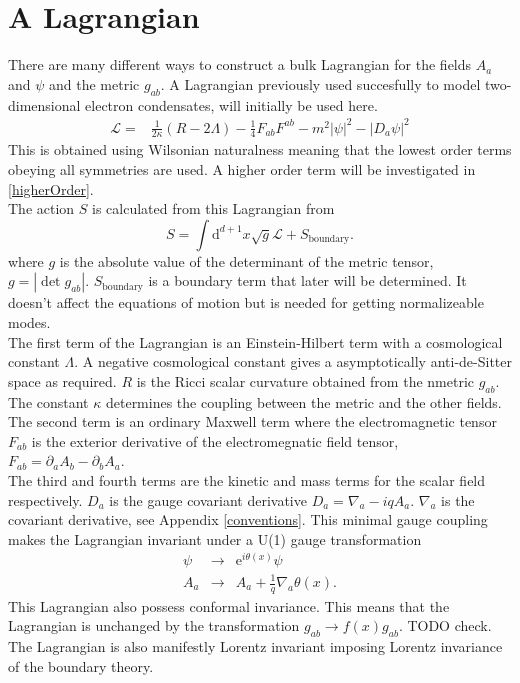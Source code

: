 \documentclass[12pt]{report}
\renewcommand{\d}{\ensuremath{\mathrm{d}}}
\renewcommand{\L}{\ensuremath{\mathcal{L}}}
\begin{document}
\section{A Lagrangian}
There are many different ways to construct a bulk Lagrangian for the fields $A_a$ and  $\psi$ and the metric $g_{ab}$. A Lagrangian previously used succesfully to model two-dimensional electron condensates\cite{hartnoll9},\cite{horowitz} will initially be used here.
\begin{eqnarray}
 \mathcal{L}=&\frac{1}{2\kappa}\left(R-2\Lambda\right)-\frac{1}{4}F_{ab}F^{ab}-m^2|\psi|^2-|D_a\psi|^2
\label{L}
\end{eqnarray}
This is obtained using Wilsonian naturalness meaning that the lowest order terms obeying all symmetries are used. A higher order term will be investigated in \ref{higherOrder}.\\

The action $S$ is calculated from this Lagrangian from
\begin{equation}
 S=\int\d^{d+1} x\sqrt{g}\L+S_\mathrm{boundary}.
\end{equation}
where $g$ is the absolute value of the determinant of the metric tensor, $g=|\det g_{ab}|$. $S_\mathrm{boundary}$ is a boundary term that later will be determined. It doesn't affect the equations of motion but is needed for getting normalizeable modes.\\

The first term of the Lagrangian is an Einstein-Hilbert term with a cosmological constant $\Lambda$. A negative cosmological constant gives a asymptotically anti-de-Sitter space as required. $R$ is the Ricci scalar curvature obtained from the nmetric $g_{ab}$. The constant $\kappa$ determines the coupling between the metric and the other fields.\\

The second term is an ordinary Maxwell term where the electromagnetic tensor $F_{ab}$ is the exterior derivative of the electromegnatic field tensor, $F_{ab}=\partial_aA_b-\partial_bA_a$.\\

The third and fourth terms are the kinetic and mass terms for the scalar field respectively. $D_a$ is the gauge covariant derivative $D_a=\nabla_a-iqA_a$. $\nabla_a$ is the covariant derivative, see Appendix \ref{conventions}. This minimal gauge coupling makes the Lagrangian invariant under a U(1) gauge transformation
\begin{eqnarray}
 \psi&\rightarrow&\mathrm{e}^{i\theta(x)}\psi\\
 A_a&\rightarrow& A_a+\frac{1}{q}\nabla_a\theta(x)\label{Agauge}.
\end{eqnarray}
This Lagrangian also possess conformal invariance. This means that the Lagrangian is unchanged by the transformation $g_{ab}\rightarrow f(x)g_{ab}$. TODO check.
The Lagrangian is also manifestly Lorentz invariant imposing Lorentz invariance of the boundary theory.
\end{document}
